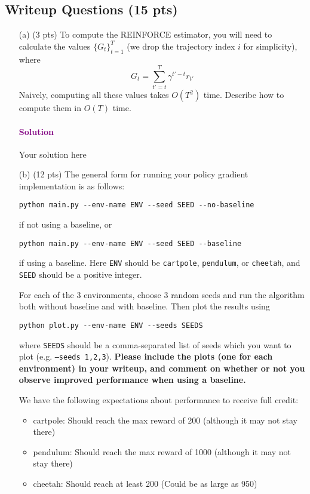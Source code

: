 \documentclass{article}
\newcommand\solution[1]{\paragraph{\textcolor{purple}{Solution}}{\color{purple} #1}}
\begin{document}
\subsection{Writeup Questions (15 pts)}
\begin{enumerate}
\item[(a) (3 pts)] To compute the REINFORCE estimator, you will need to calculate the values $\{G_t\}_{t=1}^{T}$ (we drop the trajectory index $i$ for simplicity), where
$$
G_t = \sum_{t'=t}^{T} \gamma^{t'-t} r_{t'}
$$
Naively, computing all these values takes $O(T^2)$ time. Describe how to compute them in $O(T)$ time.

\solution{
	Your solution here
}

\item[(b) (12 pts)] The general form for running your policy gradient implementation is as follows:
\begin{tcolorbox}
\begin{verbatim}
python main.py --env-name ENV --seed SEED --no-baseline
\end{verbatim}
\end{tcolorbox}
if not using a baseline, or
\begin{tcolorbox}
\begin{verbatim}
python main.py --env-name ENV --seed SEED --baseline
\end{verbatim}
\end{tcolorbox}
if using a baseline. Here \texttt{ENV} should be \texttt{cartpole}, \texttt{pendulum}, or \texttt{cheetah}, and \texttt{SEED} should be a positive integer.

For each of the 3 environments, choose 3 random seeds and run the algorithm both without baseline and with baseline. Then plot the results using
\begin{tcolorbox}
\begin{verbatim}
python plot.py --env-name ENV --seeds SEEDS
\end{verbatim}
\end{tcolorbox}
where \texttt{SEEDS} should be a comma-separated list of seeds which you want to plot (e.g. \texttt{--seeds 1,2,3}).
\textbf{Please include the plots (one for each environment) in your writeup, and comment on whether or not you observe improved performance when using a baseline.}

We have the following expectations about performance to receive full credit:
\begin{itemize}
    \item cartpole: Should reach the max reward of 200 (although it may not stay there)
    \item pendulum: Should reach the max reward of 1000 (although it may not stay there)
    \item cheetah: Should reach at least 200 (Could be as large as 950)
\end{itemize}
\end{enumerate}
\end{document}
